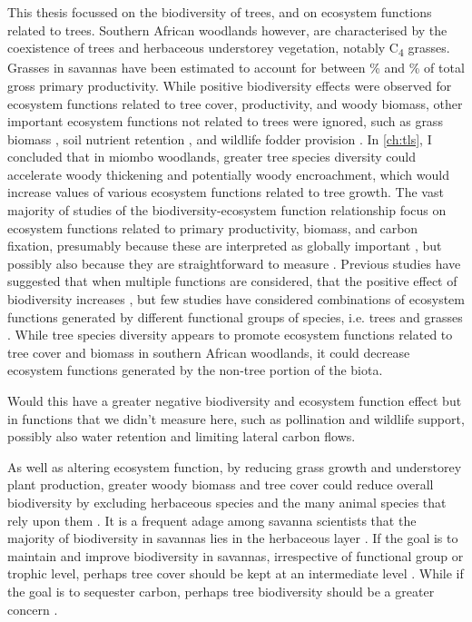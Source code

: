 \begin{refsection}

This thesis focussed on the biodiversity of trees, and on ecosystem functions related to trees. Southern African woodlands however, are characterised by the coexistence of trees and herbaceous understorey vegetation, notably C\textsubscript{4} grasses. Grasses in savannas have been estimated to account for between \% \citep{} and \% \citep{} of total gross primary productivity. While positive biodiversity effects were observed for ecosystem functions related to tree cover, productivity, and woody biomass, other important ecosystem functions not related to trees were ignored, such as grass biomass \citep{}, soil nutrient retention \citep{}, and wildlife fodder provision \citep{}. In \autoref{ch:tls}, I concluded that in miombo woodlands, greater tree species diversity could accelerate woody thickening and potentially woody encroachment, which would increase values of various ecosystem functions related to tree growth. The vast majority of studies of the biodiversity-ecosystem function relationship focus on ecosystem functions related to primary productivity, biomass, and carbon fixation, presumably because these are interpreted as globally important \citep{}, but possibly also because they are straightforward to measure \citep{}. Previous studies have suggested that when multiple functions are considered, that the positive effect of biodiversity increases \citep{Hector2007}, but few studies have considered combinations of ecosystem functions generated by different functional groups of species, i.e. trees and grasses \citep{}. While tree species diversity appears to promote ecosystem functions related to tree cover and biomass in southern African woodlands, it could decrease ecosystem functions generated by the non-tree portion of the biota. 

Would this have a greater negative biodiversity and ecosystem function effect but in functions that we didn't measure here, such as pollination and wildlife support, possibly also water retention and limiting lateral carbon flows.

As well as altering ecosystem function, by reducing grass growth and understorey plant production, greater woody biomass and tree cover could reduce overall biodiversity by excluding herbaceous species and the many animal species that rely upon them \citep{}. It is a frequent adage among savanna scientists that the majority of biodiversity in savannas lies in the herbaceous layer \citep{}. If the goal is to maintain and improve biodiversity in savannas, irrespective of functional group or trophic level, perhaps tree cover should be kept at an intermediate level \citep{}. While if the goal is to sequester carbon, perhaps tree biodiversity should be a greater concern \citep{}.


\end{refsection}
